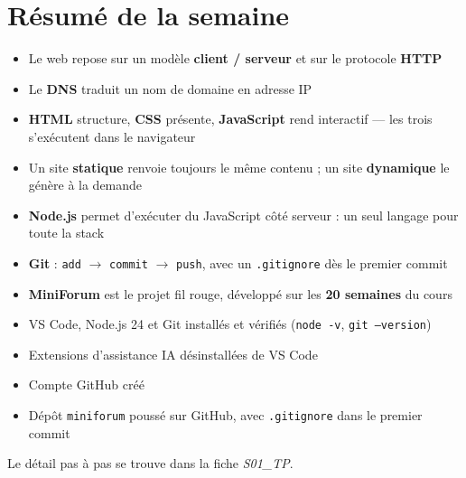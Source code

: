 \documentclass[a4paper,11pt]{article}
\begin{document}
\section*{Résumé de la semaine}

\begin{tcolorbox}[definition, title={Ce qu'il faut retenir}]
\begin{itemize}
  \item Le web repose sur un modèle \textbf{client / serveur} et sur le protocole \textbf{HTTP}
  \item Le \textbf{DNS} traduit un nom de domaine en adresse IP
  \item \textbf{HTML} structure, \textbf{CSS} présente, \textbf{JavaScript} rend interactif --- les trois s'exécutent dans le navigateur
  \item Un site \textbf{statique} renvoie toujours le même contenu ; un site \textbf{dynamique} le génère à la demande
  \item \textbf{Node.js} permet d'exécuter du JavaScript côté serveur : un seul langage pour toute la stack
  \item \textbf{Git} : \texttt{add} $\rightarrow$ \texttt{commit} $\rightarrow$ \texttt{push}, avec un \texttt{.gitignore} dès le premier commit
  \item \textbf{MiniForum} est le projet fil rouge, développé sur les \textbf{20 semaines} du cours
\end{itemize}
\end{tcolorbox}

\vspace{8pt}
\begin{tcolorbox}[attention, title={Pour la semaine 2}]
\begin{itemize}
  \item VS Code, Node.js 24 et Git installés et vérifiés (\texttt{node -v}, \texttt{git --version})
  \item Extensions d'assistance IA désinstallées de VS Code
  \item Compte GitHub créé
  \item Dépôt \texttt{miniforum} poussé sur GitHub, avec \texttt{.gitignore} dans le premier commit
\end{itemize}
Le détail pas à pas se trouve dans la fiche \textit{S01\_TP}.
\end{tcolorbox}
\end{document}
